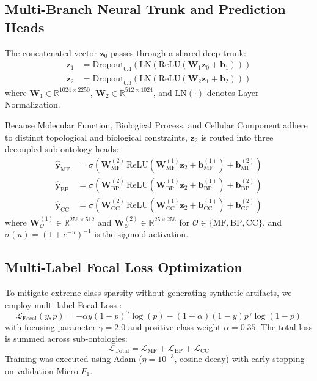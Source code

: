 \documentclass[twocolumn,10pt]{article}
\begin{document}
\subsection{Multi-Branch Neural Trunk and Prediction Heads}
The concatenated vector $\mathbf{z}_0$ passes through a shared deep trunk:
\begin{align}
\mathbf{z}_1 &= \text{Dropout}_{0.4}\left(\text{LN}\left(\text{ReLU}\left(\mathbf{W}_1 \mathbf{z}_0 + \mathbf{b}_1\right)\right)\right) \\
\mathbf{z}_2 &= \text{Dropout}_{0.3}\left(\text{LN}\left(\text{ReLU}\left(\mathbf{W}_2 \mathbf{z}_1 + \mathbf{b}_2\right)\right)\right)
\end{align}
where $\mathbf{W}_1 \in \mathbb{R}^{1024 \times 2250}$, $\mathbf{W}_2 \in \mathbb{R}^{512 \times 1024}$, and $\text{LN}(\cdot)$ denotes Layer Normalization.

Because Molecular Function, Biological Process, and Cellular Component adhere to distinct topological and biological constraints, $\mathbf{z}_2$ is routed into three decoupled sub-ontology heads:
\begin{align}
\hat{\mathbf{y}}_{\text{MF}} &= \sigma\left(\mathbf{W}_{\text{MF}}^{(2)} \, \text{ReLU}\left(\mathbf{W}_{\text{MF}}^{(1)} \mathbf{z}_2 + \mathbf{b}_{\text{MF}}^{(1)}\right) + \mathbf{b}_{\text{MF}}^{(2)}\right) \\
\hat{\mathbf{y}}_{\text{BP}} &= \sigma\left(\mathbf{W}_{\text{BP}}^{(2)} \, \text{ReLU}\left(\mathbf{W}_{\text{BP}}^{(1)} \mathbf{z}_2 + \mathbf{b}_{\text{BP}}^{(1)}\right) + \mathbf{b}_{\text{BP}}^{(2)}\right) \\
\hat{\mathbf{y}}_{\text{CC}} &= \sigma\left(\mathbf{W}_{\text{CC}}^{(2)} \, \text{ReLU}\left(\mathbf{W}_{\text{CC}}^{(1)} \mathbf{z}_2 + \mathbf{b}_{\text{CC}}^{(1)}\right) + \mathbf{b}_{\text{CC}}^{(2)}\right)
\end{align}
where $\mathbf{W}_{\mathcal{O}}^{(1)} \in \mathbb{R}^{256 \times 512}$ and $\mathbf{W}_{\mathcal{O}}^{(2)} \in \mathbb{R}^{25 \times 256}$ for $\mathcal{O} \in \{\text{MF}, \text{BP}, \text{CC}\}$, and $\sigma(u) = (1 + e^{-u})^{-1}$ is the sigmoid activation.

\subsection{Multi-Label Focal Loss Optimization}
To mitigate extreme class sparsity without generating synthetic artifacts, we employ multi-label Focal Loss \cite{lin2017focal}:
\begin{equation}
\mathcal{L}_{\text{Focal}}(y, p) = -\alpha y (1 - p)^\gamma \log(p) - (1 - \alpha) (1 - y) p^\gamma \log(1 - p)
\end{equation}
with focusing parameter $\gamma = 2.0$ and positive class weight $\alpha = 0.35$. The total loss is summed across sub-ontologies:
\begin{equation}
\mathcal{L}_{\text{Total}} = \mathcal{L}_{\text{MF}} + \mathcal{L}_{\text{BP}} + \mathcal{L}_{\text{CC}}
\end{equation}
Training was executed using Adam ($\eta = 10^{-3}$, cosine decay) with early stopping on validation Micro-$F_1$.
\end{document}
